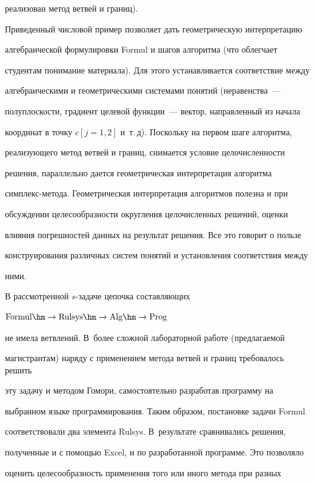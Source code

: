 реализован метод ветвей и границ).





  Приведенный числовой пример позволяет дать геометрическую интерпретацию


алгебраической формулировки Formul и шагов алгоритма (что облегчает


студентам понимание материала). Для этого устанавливается соответствие между


алгебраическими и геометрическими системами понятий (неравенства~---


полуплоскости, градиент целевой функции~--- вектор, направленный из начала


координат в точку $c[j=1, 2]$ и~т.\,д). Поскольку на первом шаге алгоритма,


реализующего метод ветвей и границ, снимается условие целочисленности


решения, параллельно дается геометрическая интерпретация алгоритма


  симплекс-ме\-то\-да. Геометрическая интерпретация алгоритмов полезна и при


обсуждении целесообразности округления целочисленных решений, оценки


влияния погрешностей данных на результат решения. Все это говорит о пользе


конструирования различных систем понятий и установления соответствия между


ними.





  В рассмотренной $s$-задаче цепочка составляющих


$\mathrm{Formul}\hm\to\mathrm{Rulsys}\hm\to\mathrm{Alg}\hm\to\mathrm{Prog}$


не имела ветвлений. В~более сложной лабораторной работе (предлагаемой


магистрантам) наряду с применением метода ветвей и границ требовалось решить


эту задачу и методом Гомори, самостоятельно разработав программу на


выбранном языке программирования. Таким образом, постановке задачи Formul


соответствовали два элемента Rulsys. В~результате сравнивались решения,


полученные и с помощью Excel, и по разработанной программе. Это позволяло


оценить целесообразность применения того или иного метода при разных


